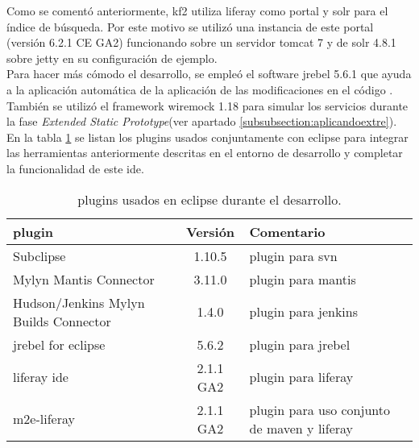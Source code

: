 Como se comentó anteriormente, \gls{kf2} utiliza \gls{liferay} como portal y \gls{solr} para el índice de búsqueda. Por este motivo se utilizó una instancia de este portal (versión 6.2.1 CE GA2) funcionando sobre un servidor \gls{tomcat} 7 y de \gls{solr} 4.8.1 sobre \gls{jetty} en su configuración de ejemplo.\\

Para hacer más cómodo el desarrollo, se empleó el \gls{software} \gls{jrebel} 5.6.1 que ayuda a la aplicación automática de la aplicación de las modificaciones en el código . También se utilizó el \gls{framework} \gls{wiremock} 1.18 para simular los servicios durante la fase \textit{Extended Static Prototype}(ver apartado \ref{subsubsection:aplicandoextre}).\\

En la tabla \ref{table:pluginseclipse} se listan los \glspl{plugin} usados conjuntamente con \gls{eclipse} para integrar las herramientas anteriormente descritas en el entorno de desarrollo y completar la funcionalidad de este \gls{ide}.

\begin{center}
\begin {table}[H]
\centering
    \begin{tabular}{ | l   c   p{7cm} |}
    \hline
    \textbf{\Gls{plugin}} &  \textbf{Versión} & \textbf{Comentario} \\ \hline
     Subclipse & 1.10.5 & \Gls{plugin} para \gls{svn} \\ \hline
     Mylyn Mantis Connector & 3.11.0 & \Gls{plugin} para \gls{mantis} \\ \hline
     Hudson/Jenkins Mylyn Builds Connector & 1.4.0 & \Gls{plugin} para \gls{jenkins} \\ \hline
     \Gls{jrebel} for \gls{eclipse} & 5.6.2 & \Gls{plugin} para \gls{jrebel} \\ \hline 
     \Gls{liferay} \gls{ide} & 2.1.1 GA2 & \Gls{plugin} para \gls{liferay} \\ \hline 
     m2e-liferay & 2.1.1 GA2 & \Gls{plugin} para uso conjunto de \gls{maven} y \gls{liferay} \\ \hline
     
    \end{tabular}
    \caption{\Glspl{plugin} usados en \gls{eclipse} durante el desarrollo.}
    \label{table:pluginseclipse}
    \end{table}
\end{center}

